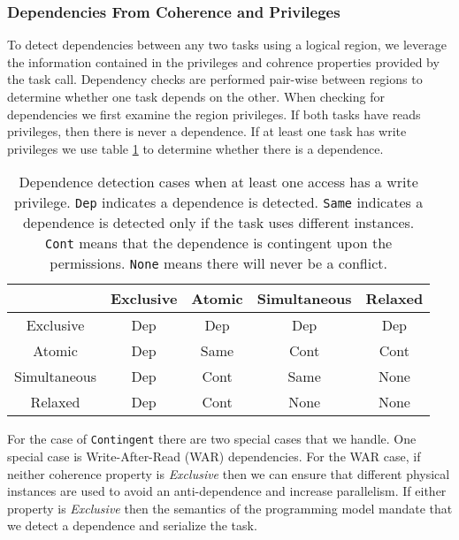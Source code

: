 \subsubsection{Dependencies From Coherence and Privileges}
\label{subsec:cohdep}
To detect dependencies between any two tasks using a logical region, we leverage
the information contained in the privileges and cohrence properties provided by the
task call.  Dependency checks are performed pair-wise between regions
to determine whether one task depends on the other.  When checking for
dependencies we first examine the region privileges.  If both tasks have reads privileges, then 
there is never a dependence.  If at least one task has write privileges we use table
\ref{tab:depsdetect} to determine whether there is a dependence.
\begin{center}
\begin{table}
\begin{tabular}{|c|c|c|c|c|} \hline
             & Exclusive & Atomic   & Simultaneous & Relaxed \\ \hline 
Exclusive    & Dep & Dep & Dep & Dep \\ \hline
Atomic       & Dep & Same & Cont & Cont \\ \hline
Simultaneous & Dep & Cont & Same & None \\ \hline
Relaxed      & Dep & Cont & None & None \\ \hline
\end{tabular}
\caption{Dependence detection cases when at least one access has a write privilege. {\tt Dep}
indicates a dependence is detected.  {\tt Same} indicates a dependence is detected
only if the task uses different instances.  {\tt Cont} means that the dependence
is contingent upon the permissions.  {\tt None} means there will never
be a conflict.\label{tab:depsdetect}}
\end{table}
\end{center}
For the case of {\tt Contingent} there are two special cases that we handle.
One special case is Write-After-Read (WAR) dependencies.  For the WAR case, if neither coherence property
is {\em Exclusive} then we can ensure that different physical instances
are used to avoid an anti-dependence and increase parallelism.  If either property is {\em Exclusive} then the semantics
of the programming model mandate that we detect a dependence and serialize the task.

